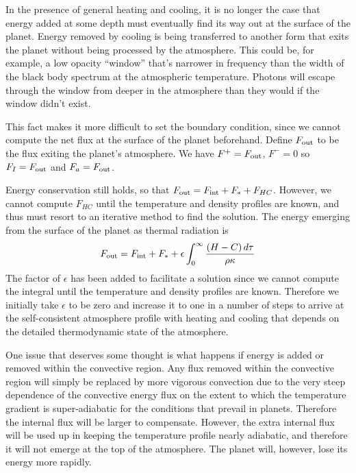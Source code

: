\documentclass{emulateapj}
\newcommand{\fsum}{F_I}
\begin{document}
In the presence of general heating and cooling, it is no longer the
case that energy added at some depth must eventually find its way out
at the surface of the planet.  Energy removed by cooling is being
transferred to another form that exits the planet without being
processed by the atmosphere.  This could be, for example, a low
opacity ``window'' that's narrower in frequency than the width of the
black body spectrum at the atmospheric temperature.  Photons will
escape through the window from deeper in the atmosphere than they
would if the window didn't exist.  

This fact makes it more difficult to set the boundary condition, since
we cannot compute the net flux at the surface of the planet
beforehand.  Define $F_{\rm out}$ to be the flux exiting the planet's
atmosphere.  We have $F^+=F_{\rm out}$, $F^-=0$ so $\fsum=F_{\rm out}$ and $F_a
= F_{\rm out}$.  

Energy conservation still holds, so that $F_{\rm out} = F_{\rm int} + F_* +
F_{HC}$.  However, we cannot compute $F_{HC}$ until the temperature
and density profiles are known, and thus must resort to an iterative
method to find the solution.  The energy emerging from the surface of
the planet as thermal radiation is
\begin{equation}
  F_{\rm out} = F_{\rm int} + F_* + 
  \epsilon \int_0^\infty \frac{(H-C)\, d\tau}{\rho\kappa}
\end{equation}
The factor of $\epsilon$ has been added to facilitate a solution since
we cannot compute the integral until the temperature and density
profiles are known.  Therefore we initially take $\epsilon$ to be zero
and increase it to one in a number of steps to arrive at the
self-consistent atmosphere profile with heating and cooling that
depends on the detailed thermodynamic state of the atmosphere.

One issue that deserves some thought is what happens if energy is
added or removed within the convective region.  Any flux removed
within the convective region will simply be replaced by more vigorous
convection due to the very steep dependence of the convective energy
flux on the extent to which the temperature gradient is
super-adiabatic for the conditions that prevail in planets.  Therefore
the internal flux will be larger to compensate.  However, the extra
internal flux will be used up in keeping the temperature profile
nearly adiabatic, and therefore it will not emerge at the top of the
atmosphere.  The planet will, however, lose its energy more rapidly.
\end{document}

